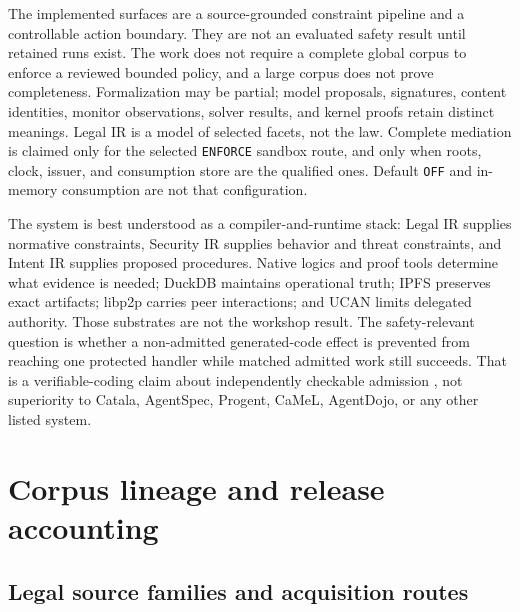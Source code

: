\documentclass{article}
\begin{document}
The implemented surfaces are a source-grounded constraint pipeline and a controllable action boundary. They are not an evaluated safety result until retained runs exist. The work does not require a complete global corpus to enforce a reviewed bounded policy, and a large corpus does not prove completeness. Formalization may be partial; model proposals, signatures, content identities, monitor observations, solver results, and kernel proofs retain distinct meanings. Legal IR is a model of selected facets, not the law. Complete mediation is claimed only for the selected \texttt{ENFORCE} sandbox route, and only when roots, clock, issuer, and consumption store are the qualified ones. Default \texttt{OFF} and in-memory consumption are not that configuration.

The system is best understood as a compiler-and-runtime stack: Legal IR supplies normative constraints, Security IR supplies behavior and threat constraints, and Intent IR supplies proposed procedures. Native logics and proof tools determine what evidence is needed; DuckDB maintains operational truth; IPFS preserves exact artifacts; libp2p carries peer interactions; and UCAN limits delegated authority. Those substrates are not the workshop result. The safety-relevant question is whether a non-admitted generated-code effect is prevented from reaching one protected handler while matched admitted work still succeeds. That is a verifiable-coding claim about independently checkable admission \citep{vericode2026cfp}, not superiority to Catala, AgentSpec, Progent, CaMeL, AgentDojo, or any other listed system.

\clearpage


\clearpage
\appendix

\section{Corpus lineage and release accounting}

\subsection{Legal source families and acquisition routes}
\end{document}
